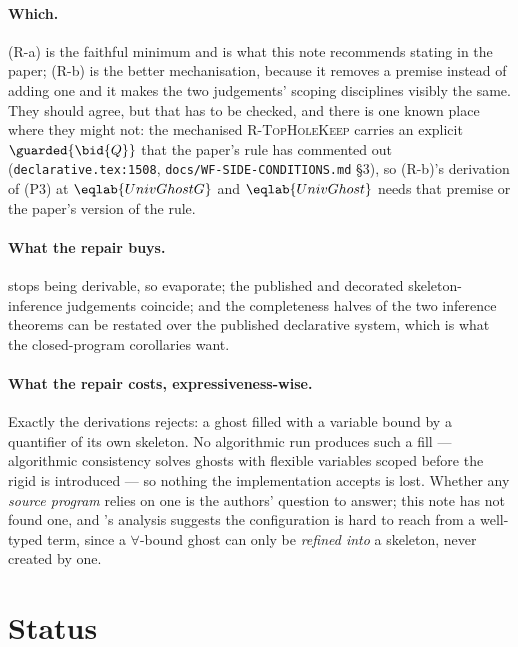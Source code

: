 \documentclass[11pt,a4paper]{article}
\theoremstyle{definition}
\newcommand{\coq}[1]{\texttt{\small #1}}
\begin{document}
\paragraph{Which.}
(R-a) is the faithful minimum and is what this note recommends stating in
the paper; (R-b) is the better mechanisation, because it removes a
premise instead of adding one and it makes the two judgements' scoping
disciplines visibly the same.  They should agree, but that has to be
checked, and there is one known place where they might not: the
mechanised \textsc{R-TopHoleKeep} carries an explicit
$\guarded{\bid{Q}}$ that the paper's rule has commented out
(\coq{declarative.tex:1508}, \coq{docs/WF-SIDE-CONDITIONS.md} \S3), so
(R-b)'s derivation of (P3) at $\eqlab{UnivGhostG}$ and $\eqlab{UnivGhost}$
needs that premise or the paper's version of the rule.

\paragraph{What the repair buys.}
 stops being derivable, so 
evaporate; the published and decorated skeleton-inference judgements
coincide; and the completeness halves of the two inference theorems can be
restated over the published declarative system, which is what the
closed-program corollaries want.

\paragraph{What the repair costs, expressiveness-wise.}
Exactly the derivations  rejects: a ghost filled with a
variable bound by a quantifier of its own skeleton.  No algorithmic run
produces such a fill --- algorithmic consistency solves ghosts with
flexible variables scoped before the rigid is introduced --- so nothing
the implementation accepts is lost.  Whether any \emph{source program}
relies on one is the authors' question to answer; this note has not found
one, and 's analysis suggests the configuration is hard to
reach from a well-typed term, since a $\forall$-bound ghost can only be
\emph{refined into} a skeleton, never created by one.

\section{Status}\label{sec:status}
\end{document}

